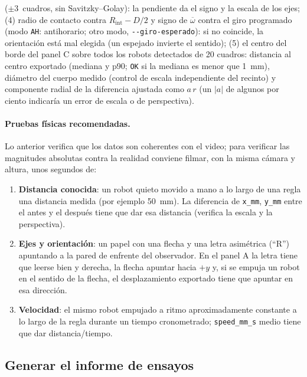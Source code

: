 \begin{itemize}
        ($\pm 3$~cuadros, sin Savitzky--Golay): la pendiente da el signo y la escala de los ejes; (4) radio
        de contacto contra $R_{\mathrm{int}}-D/2$ y signo de $\overline{\omega}$ contra el giro programado
        (modo \texttt{AH}: antihorario; otro modo, \texttt{-{}-giro-esperado}): si no coincide, la orientación
        está mal elegida (un espejado invierte el sentido); (5) el centro del borde
        del panel C sobre todos los robots detectados de 20 cuadros: distancia al centro exportado
        (mediana y p90; \texttt{OK} si la mediana es menor que \SI{1}{\milli\metre}), diámetro del cuerpo
        medido (control de escala independiente del recinto) y componente radial de la diferencia ajustada
        como $a\,r$ (un $|a|$ de algunos por ciento indicaría un error de escala o de perspectiva).
\end{itemize}

\paragraph{Pruebas físicas recomendadas.} Lo anterior verifica que los datos son coherentes con el video;
para verificar las magnitudes absolutas contra la realidad conviene filmar, con la misma cámara y
altura, unos segundos de:
\begin{enumerate}
  \item \textbf{Distancia conocida}: un robot quieto movido a mano a lo largo de una regla una distancia
        medida (por ejemplo \SI{50}{\milli\metre}). La diferencia de \texttt{x\_mm}, \texttt{y\_mm} entre el
        antes y el después tiene que dar esa distancia (verifica la escala y la perspectiva).
  \item \textbf{Ejes y orientación}: un papel con una flecha y una letra asimétrica (``R'') apuntando a la
        pared de enfrente del observador. En el panel A la letra tiene que leerse bien y derecha, la flecha
        apuntar hacia $+y$ y, si se empuja un robot en el sentido de la flecha, el desplazamiento exportado tiene
        que apuntar en esa dirección.
  \item \textbf{Velocidad}: el mismo robot empujado a ritmo aproximadamente constante a lo largo de la
        regla durante un tiempo cronometrado; \texttt{speed\_mm\_s} medio tiene que dar distancia/tiempo.
\end{enumerate}

\subsection{Generar el informe de ensayos}

